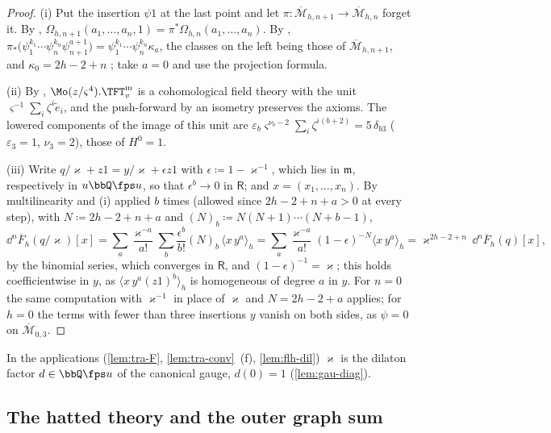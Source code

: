 \begin{proof}
(i) Put the insertion $\psi1$ at the last point and let $\pi\colon\overline{\mathcal M}_{h,n+1}\to\overline{\mathcal M}_{h,n}$ forget it. By \cite[Def.~0.3~(iii)]{PPZ15}, $\Omega_{h,n+1}(a_1,\dots,a_n,1)=\pi^*\Omega_{h,n}(a_1,\dots,a_n)$. By \cite[(1.7)]{AC96}, $\pi_*\bigl(\psi_1^{k_1}\cdots\psi_n^{k_n}\psi_{n+1}^{a+1}\bigr)=\psi_1^{k_1}\cdots\psi_n^{k_n}\kappa_a$, the classes on the left being those of $\overline{\mathcal M}_{h,n+1}$, and $\kappa_0=2h-2+n$ \cite[p.~5]{AC96}; take $a=0$ and use the projection formula.

(ii) By \cite[Prop.~2.12, Def.~2.13]{PPZ15}, $\Mo(z/\varsigma^4).\TFT^{\mathrm m}_v$ is a cohomological field theory with the unit $\varsigma^{-1}\sum_i\zeta^i\tilde e_i$, and the push-forward by an isometry preserves the axioms. The lowered components of the image of this unit are $\varepsilon_b\varsigma^{\nu_b-2}\sum_i\zeta^{i(b+2)}=5\,\delta_{b3}$ ($\varepsilon_3=1$, $\nu_3=2$), those of $H^0=1$.

(iii) Write $q/\varkappa+z1=y/\varkappa+\epsilon z1$ with $\epsilon\coloneqq1-\varkappa^{-1}$, which lies in $\mathfrak m$, respectively in $u\bbQ\fps u$, so that $\epsilon^b\to0$ in $\mathsf R$; and $x=(x_1,\dots,x_n)$. By multilinearity and (i) applied $b$ times (allowed since $2h-2+n+a>0$ at every step), with $N\coloneqq2h-2+n+a$ and $(N)_b\coloneqq N(N+1)\cdots(N+b-1)$,
\[
\dd^n\overline F_h(q/\varkappa)[x]=\sum_a\frac{\varkappa^{-a}}{a!}\sum_b\frac{\epsilon^b}{b!}(N)_b\,\langle x\,y^a\rangle_h=\sum_a\frac{\varkappa^{-a}}{a!}(1-\epsilon)^{-N}\langle x\,y^a\rangle_h=\varkappa^{2h-2+n}\,\dd^n\overline F_h(q)[x],
\]
by the binomial series, which converges in $\mathsf R$, and $(1-\epsilon)^{-1}=\varkappa$; this holds coefficientwise in $y$, as $\langle x\,y^a(z1)^b\rangle_h$ is homogeneous of degree $a$ in $y$. For $n=0$ the same computation with $\varkappa^{-1}$ in place of $\varkappa$ and $N=2h-2+a$ applies; for $h=0$ the terms with fewer than three insertions $y$ vanish on both sides, as $\psi=0$ on $\overline{\mathcal M}_{0,3}$.
\end{proof}

In the applications (\cref{lem:tra-F}, \cref{lem:tra-conv}~(f), \cref{lem:flh-dil}) $\varkappa$ is the dilaton factor $d\in\bbQ\fps u$ of the canonical gauge, $d(0)=1$ (\cref{lem:gau-diag}).

\subsection{The hatted theory and the outer graph sum}
\label{sec:set-hat}

